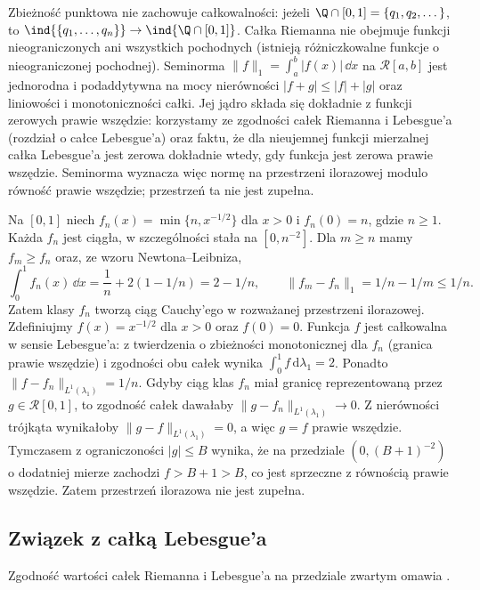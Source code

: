 \begin{uwaga}
Zbieżność punktowa nie zachowuje całkowalności: jeżeli $\Q\cap[0,1]=\{q_1,q_2,\dots\}$, to $\ind{\{q_1,\dots,q_n\}}\to\ind{\Q\cap[0,1]}$. Całka Riemanna nie obejmuje funkcji nieograniczonych ani wszystkich pochodnych (istnieją różniczkowalne funkcje o nieograniczonej pochodnej). Seminorma $\|f\|_1=\int_a^b|f(x)|\,\dd x$ na $\mathcal R[a,b]$ jest jednorodna i podaddytywna na mocy nierówności $|f+g|\le|f|+|g|$ oraz liniowości i monotoniczności całki. Jej jądro składa się dokładnie z funkcji zerowych prawie wszędzie: korzystamy ze zgodności całek Riemanna i Lebesgue'a (rozdział o całce Lebesgue'a) oraz faktu, że dla nieujemnej funkcji mierzalnej całka Lebesgue'a jest zerowa dokładnie wtedy, gdy funkcja jest zerowa prawie wszędzie. Seminorma wyznacza więc normę na przestrzeni ilorazowej modulo równość prawie wszędzie; przestrzeń ta nie jest zupełna.
\end{uwaga}
\begin{przyklad}
Na $[0,1]$ niech $f_n(x)=\min\{n,x^{-1/2}\}$ dla $x>0$ i $f_n(0)=n$, gdzie $n\ge1$. Każda $f_n$ jest ciągła, w szczególności stała na $[0,n^{-2}]$. Dla $m\ge n$ mamy $f_m\ge f_n$ oraz, ze wzoru Newtona--Leibniza,
\[
 \int_0^1 f_n(x)\,\dd x=\frac1n+2(1-1/n)=2-1/n,
 \qquad
 \|f_m-f_n\|_1=1/n-1/m\le 1/n.
\]
Zatem klasy $f_n$ tworzą ciąg Cauchy'ego w rozważanej przestrzeni ilorazowej. Zdefiniujmy $f(x)=x^{-1/2}$ dla $x>0$ oraz $f(0)=0$. Funkcja $f$ jest całkowalna w sensie Lebesgue'a: z twierdzenia o zbieżności monotonicznej dla $f_n$ (granica prawie wszędzie) i zgodności obu całek wynika $\int_0^1 f\,\mathrm d\lambda_1=2$. Ponadto $\|f-f_n\|_{L^1(\lambda_1)}=1/n$. Gdyby ciąg klas $f_n$ miał granicę reprezentowaną przez $g\in\mathcal R[0,1]$, to zgodność całek dawałaby $\|g-f_n\|_{L^1(\lambda_1)}\to0$. Z nierówności trójkąta wynikałoby $\|g-f\|_{L^1(\lambda_1)}=0$, a więc $g=f$ prawie wszędzie. Tymczasem z ograniczoności $|g|\le B$ wynika, że na przedziale $(0,(B+1)^{-2})$ o dodatniej mierze zachodzi $f>B+1>B$, co jest sprzeczne z równością prawie wszędzie. Zatem przestrzeń ilorazowa nie jest zupełna.
\end{przyklad}

\subsection{Związek z całką Lebesgue'a}
Zgodność wartości całek Riemanna i Lebesgue'a na przedziale zwartym omawia .

